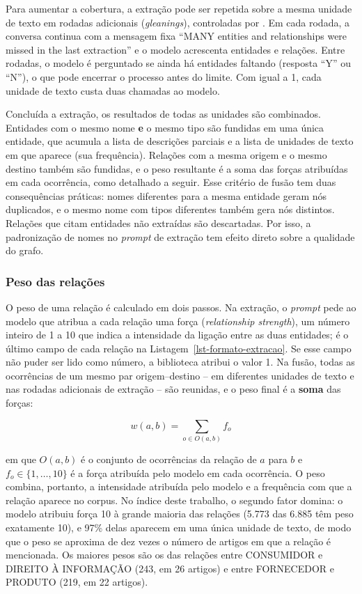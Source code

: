 Para aumentar a cobertura, a extração pode ser repetida sobre a mesma unidade de texto em rodadas adicionais (\textit{gleanings}), controladas por . Em cada rodada, a conversa continua com a mensagem fixa ``MANY entities and relationships were missed in the last extraction'' e o modelo acrescenta entidades e relações. Entre rodadas, o modelo é perguntado se ainda há entidades faltando (resposta ``Y'' ou ``N''), o que pode encerrar o processo antes do limite. Com  igual a 1, cada unidade de texto custa duas chamadas ao modelo.

Concluída a extração, os resultados de todas as unidades são combinados. Entidades com o mesmo nome \textbf{e} o mesmo tipo são fundidas em uma única entidade, que acumula a lista de descrições parciais e a lista de unidades de texto em que aparece (sua frequência). Relações com a mesma origem e o mesmo destino também são fundidas, e o peso resultante é a soma das forças atribuídas em cada ocorrência, como detalhado a seguir. Esse critério de fusão tem duas consequências práticas: nomes diferentes para a mesma entidade geram nós duplicados, e o mesmo nome com tipos diferentes também gera nós distintos. Relações que citam entidades não extraídas são descartadas. Por isso, a padronização de nomes no \textit{prompt} de extração tem efeito direto sobre a qualidade do grafo.

\subsubsection*{Peso das relações}

O peso de uma relação é calculado em dois passos. Na extração, o \textit{prompt} pede ao modelo que atribua a cada relação uma força (\textit{relationship strength}), um número inteiro de 1 a 10 que indica a intensidade da ligação entre as duas entidades; é o último campo de cada relação na Listagem~\ref{lst-formato-extracao}. Se esse campo não puder ser lido como número, a biblioteca atribui o valor 1. Na fusão, todas as ocorrências de um mesmo par origem--destino -- em diferentes unidades de texto e nas rodadas adicionais de extração -- são reunidas, e o peso final é a \textbf{soma} das forças:

\begin{equation}
\label{eq-peso}
w(a, b) = \sum_{o \in O(a,b)} f_o
\end{equation}

\noindent em que $O(a,b)$ é o conjunto de ocorrências da relação de $a$ para $b$ e $f_o \in \{1, \dots, 10\}$ é a força atribuída pelo modelo em cada ocorrência. O peso combina, portanto, a intensidade atribuída pelo modelo e a frequência com que a relação aparece no corpus. No índice deste trabalho, o segundo fator domina: o modelo atribuiu força 10 à grande maioria das relações (5.773 das 6.885 têm peso exatamente 10), e 97\% delas aparecem em uma única unidade de texto, de modo que o peso se aproxima de dez vezes o número de artigos em que a relação é mencionada. Os maiores pesos são os das relações entre CONSUMIDOR e DIREITO À INFORMAÇÃO (243, em 26 artigos) e entre FORNECEDOR e PRODUTO (219, em 22 artigos).

